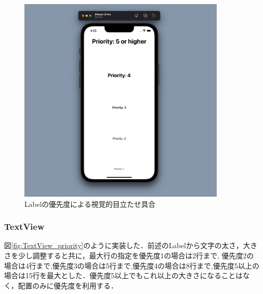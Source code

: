 \begin{figure}[htbp]
  \begin{minipage}{\hsize}
    \begin{center}
       \includegraphics[width=100mm]{img/Label_priority.png}
    \end{center}
    \caption{Labelの優先度による視覚的目立たせ具合}
    \label{fig:label_priority}
  \end{minipage}
\end{figure}

\subsubsection{TextView}
図\ref{fig:TextView_priority}のように実装した．前述のLabelから文字の太さ，大きさを少し調整すると共に，最大行の指定を優先度1の場合は2行まで, 優先度2の場合は4行まで,優先度3の場合は5行まで,優先度4の場合は8行まで,優先度5以上の場合は15行を最大とした．優先度5以上でもこれ以上の大きさになることはなく，配置のみに優先度を利用する．

